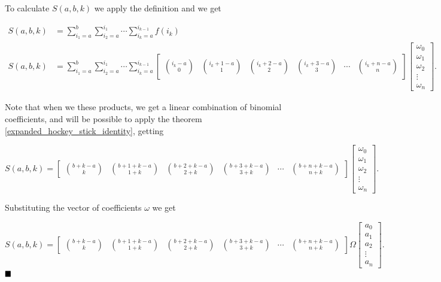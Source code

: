 \documentclass[12pt]{article}
\begin{document}
To calculate $S(a, b, k)$ we apply the definition and we get

\begin{align*}
    S(a, b, k) & = \sum_{i_1=a}^{b}\sum_{i_2=a}^{i_1} \cdots \sum_{i_k=a}^{i_{k-1}} f(i_k) \\
    S(a, b, k) & = \sum_{i_1=a}^{b}\sum_{i_2=a}^{i_1} \cdots \sum_{i_k=a}^{i_{k-1}}
    \begin{bmatrix}
        \binom{i_k-a}{0} & \binom{i_k+1-a}{1} & \binom{i_k+2-a}{2} & \binom{i_k+3-a}{3} & \cdots & \binom{i_k+n-a}{n}
    \end{bmatrix} \begin{bmatrix}
                      \omega_0 \\ \omega_1 \\ \omega_2 \\ \vdots \\ \omega_n
                  \end{bmatrix}.
\end{align*}

Note that when we these products, we get a linear combination of binomial coefficients, and will be possible to apply the theorem \ref{expanded_hockey_stick_identity}, getting

$$
    S(a, b, k) = \begin{bmatrix}
        \binom{b+k-a}{k} & \binom{b+1+k-a}{1+k} & \binom{b+2+k-a}{2+k} & \binom{b+3+k-a}{3+k} & \cdots & \binom{b+n+k-a}{n+k}
    \end{bmatrix} \begin{bmatrix}
        \omega_0 \\ \omega_1 \\ \omega_2 \\ \vdots \\ \omega_n
    \end{bmatrix}.
$$

\pagebreak

Substituting the vector of coefficients $\omega$ we get

$$
    \boxed{S(a, b, k) =
        \begin{bmatrix}
            \binom{b+k-a}{k} & \binom{b+1+k-a}{1+k} & \binom{b+2+k-a}{2+k} & \binom{b+3+k-a}{3+k} & \cdots & \binom{b+n+k-a}{n+k}
        \end{bmatrix} \Omega
        \begin{bmatrix}
            a_0 \\ a_1 \\ a_2 \\ \vdots \\ a_n
        \end{bmatrix}}.
$$
$\hfill\blacksquare$
\end{document}
